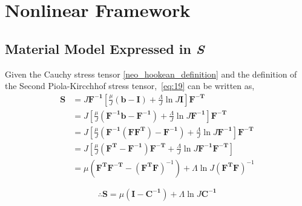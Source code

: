 \appendix %



\chapter{Nonlinear Framework} %

\label{AppendixA} %


\section{Material Model Expressed in \emph{\textbf{S}}}
    Given the Cauchy stress tensor \eqref{neo_hookean_definition} and the definition of the Second
     Piola-Kircchhof stress tensor,~\eqref{eq:19} can be written as,
    \begin{equation}
        \begin{split}
        {\boldsymbol{S}} &= {J \boldsymbol{F^{-1}}} \left[ \frac{\mu}{J} \left(\boldsymbol{b} - \boldsymbol{I}\right) + \frac{\Lambda}{J}\ln{J}\boldsymbol{I}\right] \boldsymbol{F^{-T}}\\
        &= {J}  {\left[ \frac{\mu}{J} \left(\boldsymbol{F^{-1}b} - \boldsymbol{F^{-1}}\right) + \frac{\Lambda}{J}\ln{J}\boldsymbol{F^{-1}}\right] \boldsymbol{F^{-T}}}\\
        &= {J} {\left[ \frac{\mu}{J} \left(\boldsymbol{F^{-1}}\left(\boldsymbol{FF^T}\right) - \boldsymbol{F^{-1}}\right) + \frac{\Lambda}{J}\ln{J}\boldsymbol{F^{-1}}\right]} \boldsymbol{F^{-T}}\\ 
        &= {J} {\left[ \frac{\mu}{J} \left(\boldsymbol{F^T} - \boldsymbol{F^{-1}} \right) \boldsymbol{F^{-T}} + \frac{\Lambda}{J} \ln{J}\boldsymbol{F^{-1}F^{-T}} \right]}\\ 
        &= \mu \left( {\boldsymbol{F^TF^{-T}}} - \left( {\boldsymbol{F^TF}} \right)^{-1} \right) + \Lambda{\ln{J}\left(\boldsymbol{F^TF}\right)^{-1}}
        \end{split}
    \end{equation}
    
    \begin{equation}\label{S_neohookean}
        \therefore {\boldsymbol{S} = \mu\left(\boldsymbol{I} - \boldsymbol{C^{-1}}\right) + \Lambda\ln{J}\boldsymbol{C^{-1}}}
    \end{equation}
